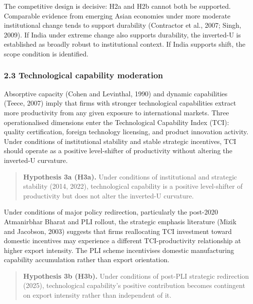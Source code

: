 \documentclass[
  12pt,a4paper]{article}
\begin{document}
The competitive design is decisive: H2a and H2b cannot both be
supported. Comparable evidence from emerging Asian economies under more
moderate institutional change tends to support durability (Contractor et
al., 2007; Singh, 2009). If India under extreme change also supports
durability, the inverted-U is established as broadly robust to
institutional context. If India supports shift, the scope condition is
identified.

\hypertarget{technological-capability-moderation}{%
\subsubsection{2.3 Technological capability
moderation}\label{technological-capability-moderation}}

Absorptive capacity (Cohen and Levinthal, 1990) and dynamic capabilities
(Teece, 2007) imply that firms with stronger technological capabilities
extract more productivity from any given exposure to international
markets. Three operationalised dimensions enter the Technological
Capability Index (TCI): quality certification, foreign technology
licensing, and product innovation activity. Under conditions of
institutional stability and stable strategic incentives, TCI should
operate as a positive level-shifter of productivity without altering the
inverted-U curvature.

\begin{quote}
\textbf{Hypothesis 3a (H3a).} Under conditions of institutional and
strategic stability (2014, 2022), technological capability is a positive
level-shifter of productivity but does not alter the inverted-U
curvature.
\end{quote}

Under conditions of major policy redirection, particularly the post-2020
Atmanirbhar Bharat and PLI rollout, the strategic emphasis literature
(Mizik and Jacobson, 2003) suggests that firms reallocating TCI
investment toward domestic incentives may experience a different
TCI-productivity relationship at higher export intensity. The PLI scheme
incentivises domestic manufacturing capability accumulation rather than
export orientation.

\begin{quote}
\textbf{Hypothesis 3b (H3b).} Under conditions of post-PLI strategic
redirection (2025), technological capability's positive contribution
becomes contingent on export intensity rather than independent of it.
\end{quote}
\end{document}
